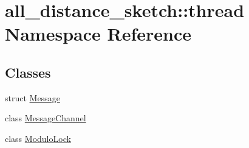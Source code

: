 \hypertarget{namespaceall__distance__sketch_1_1thread}{}\section{all\+\_\+distance\+\_\+sketch\+:\+:thread Namespace Reference}
\label{namespaceall__distance__sketch_1_1thread}
\subsection*{Classes}
\begin{DoxyCompactItemize}
\item 
struct \hyperlink{structall__distance__sketch_1_1thread_1_1Message}{Message}
\item 
class \hyperlink{classall__distance__sketch_1_1thread_1_1MessageChannel}{Message\+Channel}
\item 
class \hyperlink{classall__distance__sketch_1_1thread_1_1ModuloLock}{Modulo\+Lock}
\end{DoxyCompactItemize}
